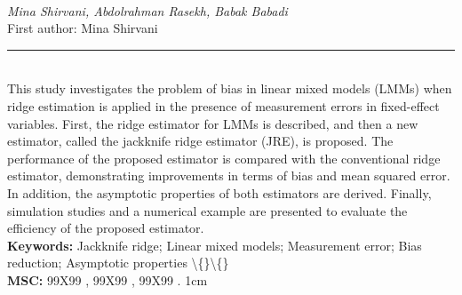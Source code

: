 \documentclass[10pt,twoside]{article}
\begin{document}
\noindent\begin{minipage}[t][\textheight]{\textwidth}
\\[0.35em]
{\itshape Mina Shirvani, Abdolrahman Rasekh, Babak Babadi}\\[0.2em]
{\footnotesize First author: Mina Shirvani}\\[0.45em]
\noindent\rule{\textwidth}{0.3pt}\\[0.4em]
{\footnotesize  This study investigates the problem of bias in linear mixed models (LMMs) when ridge estimation is applied in the presence of measurement errors in fixed-effect variables. First, the ridge estimator for LMMs is described, and then a new estimator, called the jackknife ridge estimator (JRE), is proposed. The performance of the proposed estimator is compared with the conventional ridge estimator, demonstrating improvements in terms of bias and mean squared error. In addition, the asymptotic properties of both estimators are derived. Finally, simulation studies and a numerical example are presented to evaluate the efficiency of the proposed estimator.}\\[0.4em]
{\footnotesize\bfseries Keywords:} {\footnotesize Jackknife ridge; Linear mixed models; Measurement error; Bias reduction; Asymptotic properties \textbackslash\{\}\textbackslash\{\}}\\[0.15em]
{\footnotesize\bfseries MSC:} {\footnotesize 99X99 , 99X99 , 99X99 . 1cm}\\
\vfill
\end{minipage}
\newpage
\end{document}
